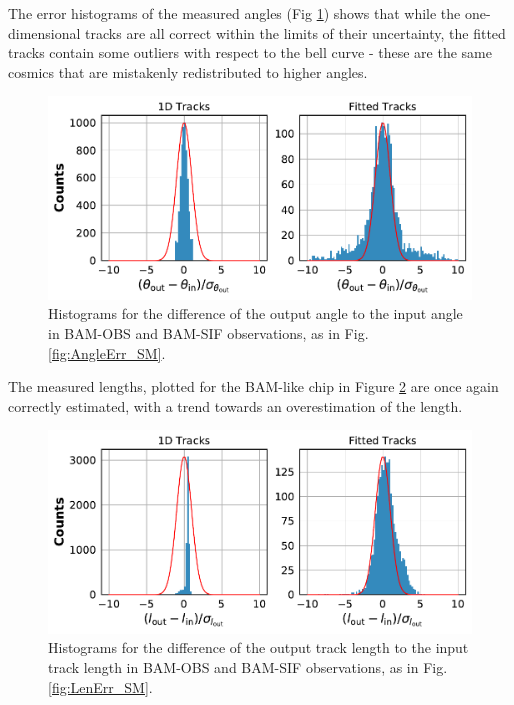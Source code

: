 \documentclass[a4paper, 11pt]{article}
\begin{document}
The error histograms of the measured angles (Fig \ref{fig:AngleErr_BAM}) shows that while the one-dimensional tracks are all correct within the limits of their uncertainty, the fitted tracks contain some outliers with respect to the bell curve - these are the same cosmics that are mistakenly redistributed to higher angles.

\begin{figure}[h]
  \centering
  \includegraphics[width=\textwidth]{images/postprocessing/AngleErr_BAM}
  \caption{Histograms for the difference of the output angle to the input angle in BAM-OBS and BAM-SIF observations, as in Fig. \ref{fig:AngleErr_SM}.}
  \label{fig:AngleErr_BAM}
\end{figure}

The measured lengths, plotted for the BAM-like chip in Figure \ref{fig:LenErr_BAM} are once again correctly estimated, with a trend towards an overestimation of the length.

\begin{figure}[h]
  \centering
  \includegraphics[width=\textwidth]{images/postprocessing/LenErr_BAM}
  \caption{Histograms for the difference of the output track length to the input track length in BAM-OBS and BAM-SIF observations, as in Fig. \ref{fig:LenErr_SM}.}
  \label{fig:LenErr_BAM}
\end{figure}
\end{document}
